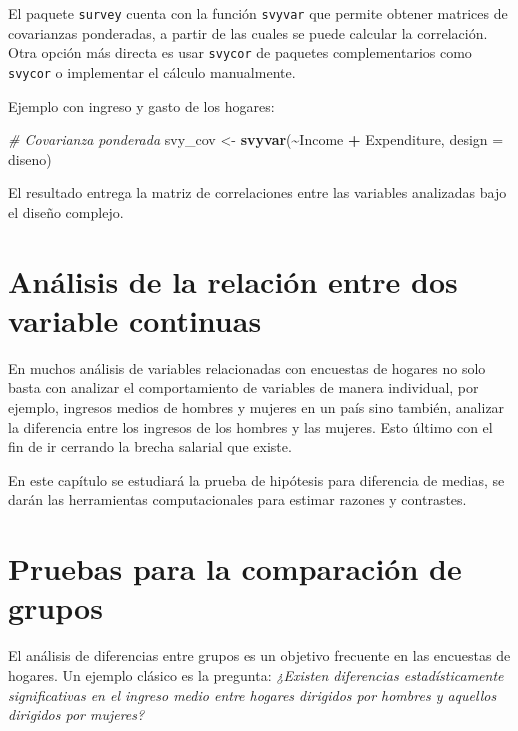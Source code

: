 \documentclass[
  spanish,
  12pt,
]{book}
\newenvironment{Shaded}{\begin{snugshade}}{\end{snugshade}}
\newcommand{\AttributeTok}[1]{\textcolor[rgb]{0.13,0.29,0.53}{#1}}
\newcommand{\CommentTok}[1]{\textcolor[rgb]{0.56,0.35,0.01}{\textit{#1}}}
\newcommand{\FunctionTok}[1]{\textcolor[rgb]{0.13,0.29,0.53}{\textbf{#1}}}
\newcommand{\NormalTok}[1]{#1}
\newcommand{\OtherTok}[1]{\textcolor[rgb]{0.56,0.35,0.01}{#1}}
\newcommand{\SpecialCharTok}[1]{\textcolor[rgb]{0.81,0.36,0.00}{\textbf{#1}}}
\begin{document}
El paquete \texttt{survey} cuenta con la función \texttt{svyvar} que permite obtener matrices de covarianzas ponderadas, a partir de las cuales se puede calcular la correlación. Otra opción más directa es usar \texttt{svycor} de paquetes complementarios como \texttt{svycor} o implementar el cálculo manualmente.

Ejemplo con ingreso y gasto de los hogares:

\begin{Shaded}
\begin{Highlighting}[]
\CommentTok{\# Covarianza ponderada}
\NormalTok{svy\_cov }\OtherTok{\textless{}{-}} \FunctionTok{svyvar}\NormalTok{(}\SpecialCharTok{\textasciitilde{}}\NormalTok{Income }\SpecialCharTok{+}\NormalTok{ Expenditure, }\AttributeTok{design =}\NormalTok{ diseno)}
\end{Highlighting}
\end{Shaded}

El resultado entrega la matriz de correlaciones entre las variables analizadas bajo el diseño complejo.

\section{Análisis de la relación entre dos variable continuas}\label{anuxe1lisis-de-la-relaciuxf3n-entre-dos-variable-continuas}

En muchos análisis de variables relacionadas con encuestas de hogares no solo basta con analizar el comportamiento de variables de manera individual, por ejemplo, ingresos medios de hombres y mujeres en un país sino también, analizar la diferencia entre los ingresos de los hombres y las mujeres. Esto último con el fin de ir cerrando la brecha salarial que existe.

En este capítulo se estudiará la prueba de hipótesis para diferencia de medias, se darán las herramientas computacionales para estimar razones y contrastes.

\section{Pruebas para la comparación de grupos}\label{pruebas-para-la-comparaciuxf3n-de-grupos}

El análisis de diferencias entre grupos es un objetivo frecuente en las encuestas de hogares. Un ejemplo clásico es la pregunta: \emph{¿Existen diferencias estadísticamente significativas en el ingreso medio entre hogares dirigidos por hombres y aquellos dirigidos por mujeres?}
\end{document}
